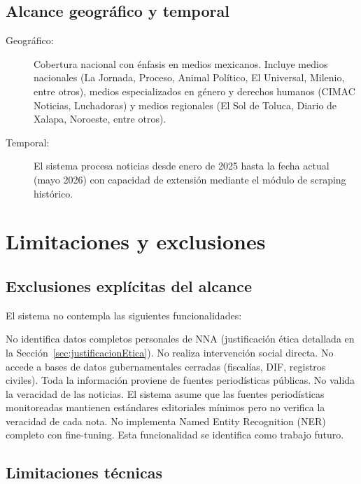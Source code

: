 \subsection{Alcance geográfico y temporal}

\begin{description}
    \item[Geográfico:] Cobertura nacional con énfasis en medios mexicanos. Incluye medios nacionales (La Jornada, Proceso, Animal Político, El Universal, Milenio, entre otros), medios especializados en género y derechos humanos (CIMAC Noticias, Luchadoras) y medios regionales (El Sol de Toluca, Diario de Xalapa, Noroeste, entre otros).
    
    \item[Temporal:] El sistema procesa noticias desde enero de 2025 hasta la fecha actual (mayo 2026) con capacidad de extensión mediante el módulo de scraping histórico.
\end{description}

\section{Limitaciones y exclusiones}
\label{sec:limitaciones}

\subsection{Exclusiones explícitas del alcance}

El sistema no contempla las siguientes funcionalidades:\\

\begin{Titemize}
    \Titem No identifica datos completos personales de NNA (justificación ética detallada en la Sección~\ref{sec:justificacionEtica}).
    \Titem No realiza intervención social directa.
    \Titem No accede a bases de datos gubernamentales cerradas (fiscalías, DIF, registros civiles). Toda la información proviene de fuentes periodísticas públicas.
    \Titem No valida la veracidad de las noticias. El sistema asume que las fuentes periodísticas monitoreadas mantienen estándares editoriales mínimos pero no verifica la veracidad de cada nota.   
    \Titem No implementa Named Entity Recognition (NER) completo con fine-tuning. Esta funcionalidad se identifica como trabajo futuro.
\end{Titemize}

\subsection{Limitaciones técnicas}

